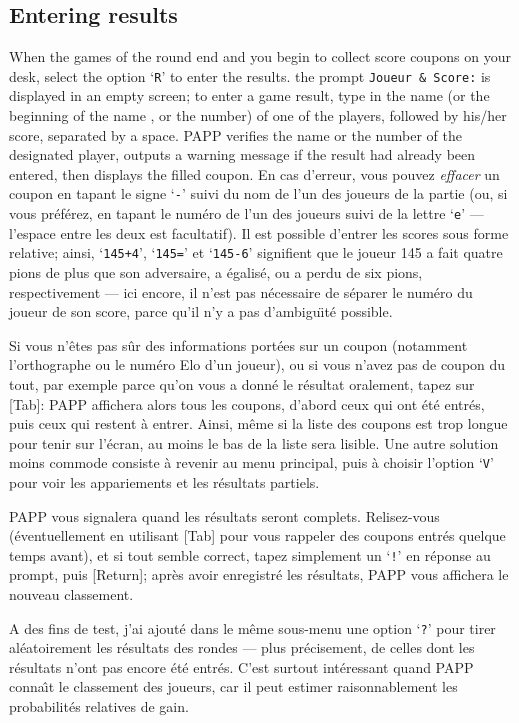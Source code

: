 \documentclass[10pt]{article}
\begin{document}
\subsection{Entering results}

When the games of the round end and you begin to collect score coupons 
on your desk, select the option `\verb|R|' to enter the results.  the 
prompt \verb|Joueur & Score:| is displayed in an empty screen; to 
enter a game result, type in the name (or the beginning of the name , 
or the number) of one of the players, followed by his/her score, 
separated by a space.  PAPP verifies the name or the number of the 
designated player, outputs a warning message if the result had already 
been entered, then displays the filled coupon.  En cas d'erreur, vous 
pouvez {\em effacer} un coupon en tapant le signe `\verb|-|' suivi du 
nom de l'un des joueurs de la partie (ou, si vous pr\'ef\'erez, en 
tapant le num\'ero de l'un des joueurs suivi de la lettre `\verb|e|' 
--- l'espace entre les deux est facultatif).  Il est possible d'entrer 
les scores sous forme relative; ainsi, `\verb|145+4|', `\verb|145=|' 
et `\verb|145-6|' signifient que le joueur 145 a fait quatre pions de 
plus que son adversaire, a \'egalis\'e, ou a perdu de six pions, 
respectivement --- ici encore, il n'est pas n\'ecessaire de s\'eparer 
le num\'ero du joueur de son score, parce qu'il n'y a pas 
d'ambigu{\"\i}t\'e possible.

Si vous n'\^etes pas s\^ur des informations port\'ees sur un coupon 
(notamment l'orthographe ou le num\'ero Elo d'un joueur), ou si vous 
n'avez pas de coupon du tout, par exemple parce qu'on vous a donn\'e 
le r\'esultat oralement, tapez sur [Tab]: PAPP affichera alors tous 
les coupons, d'abord ceux qui ont \'et\'e entr\'es, puis ceux qui 
restent \`a entrer.  Ainsi, m\^eme si la liste des coupons est trop 
longue pour tenir sur l'\'ecran, au moins le bas de la liste sera 
lisible.  Une autre solution moins commode consiste \`a revenir au 
menu principal, puis \`a choisir l'option `\verb|V|' pour voir les 
appariements et les r\'esultats partiels.

	PAPP vous signalera quand les r\'esultats seront complets.
Relisez-vous (\'eventuellement en utilisant [Tab] pour vous rappeler des
coupons entr\'es quelque temps avant), et si tout semble correct, tapez
simplement un `\verb|!|' en r\'eponse au prompt, puis [Return]; apr\`es
avoir enregistr\'e les r\'esultats, PAPP vous affichera le nouveau
classement. 

	A des fins de test, j'ai ajout\'e dans le m\^eme sous-menu une
option `\verb|?|' pour tirer al\'eatoirement les r\'esultats des rondes
--- plus pr\'ecisement, de celles dont les r\'esultats n'ont pas encore
\'et\'e entr\'es.  C'est surtout int\'eressant quand PAPP conna{\^\i}t
le classement des joueurs, car il peut estimer raisonnablement les
probabilit\'es relatives de gain.
\end{document}
